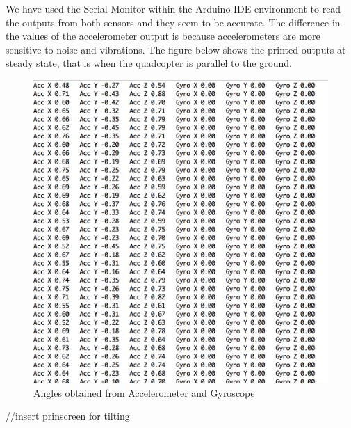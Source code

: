 

We have used the Serial Monitor within the Arduino IDE environment to read the outputs from both sensors and they seem to be accurate. The difference in the values of the accelerometer output is because accelerometers are more sensitive to noise and vibrations. The figure below shows the printed outputs at steady state, that is when the quadcopter is parallel to the ground.

\begin{figure}[H]
  \centering
    \includegraphics[width=1\textwidth]{images/accgy.png}
	\caption{Angles obtained from Accelerometer and Gyroscope}
\end{figure}

//insert prinscreen for tilting 